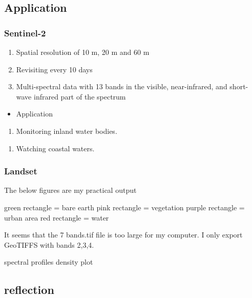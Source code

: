 \documentclass[
  letterpaper,
  DIV=11,
  numbers=noendperiod]{scrreprt}
\providecommand{\tightlist}{%
  \setlength{\itemsep}{0pt}\setlength{\parskip}{0pt}}\usepackage{longtable,booktabs,array}
\begin{document}
\hypertarget{application}{%
\subsection{Application}\label{application}}

\hypertarget{sentinel-2}{%
\subsubsection{Sentinel-2}\label{sentinel-2}}

\begin{enumerate}
\def\labelenumi{\arabic{enumi}.}
\tightlist
\item
  Spatial resolution of 10 m, 20 m and 60 m
\item
  Revisiting every 10 days
\item
  Multi-spectral data with 13 bands in the visible, near-infrared, and
  short-wave infrared part of the spectrum
\end{enumerate}

\begin{itemize}
\tightlist
\item
  Application
\end{itemize}

\begin{enumerate}
\def\labelenumi{\arabic{enumi}.}
\tightlist
\item
  Monitoring inland water bodies.
\end{enumerate}

\begin{enumerate}
\def\labelenumi{\arabic{enumi}.}
\setcounter{enumi}{1}
\tightlist
\item
  Watching coastal waters.
\end{enumerate}

\hypertarget{landset}{%
\subsubsection{Landset}\label{landset}}

The below figures are my practical output

green rectangle = bare earth pink rectangle = vegetation purple
rectangle = urban area red rectangle = water

It seems that the 7 bands.tif file is too large for my computer. I only
export GeoTIFFS with bands 2,3,4.

spectral profiles density plot

\hypertarget{reflection}{%
\subsection{reflection}\label{reflection}}
\end{document}
